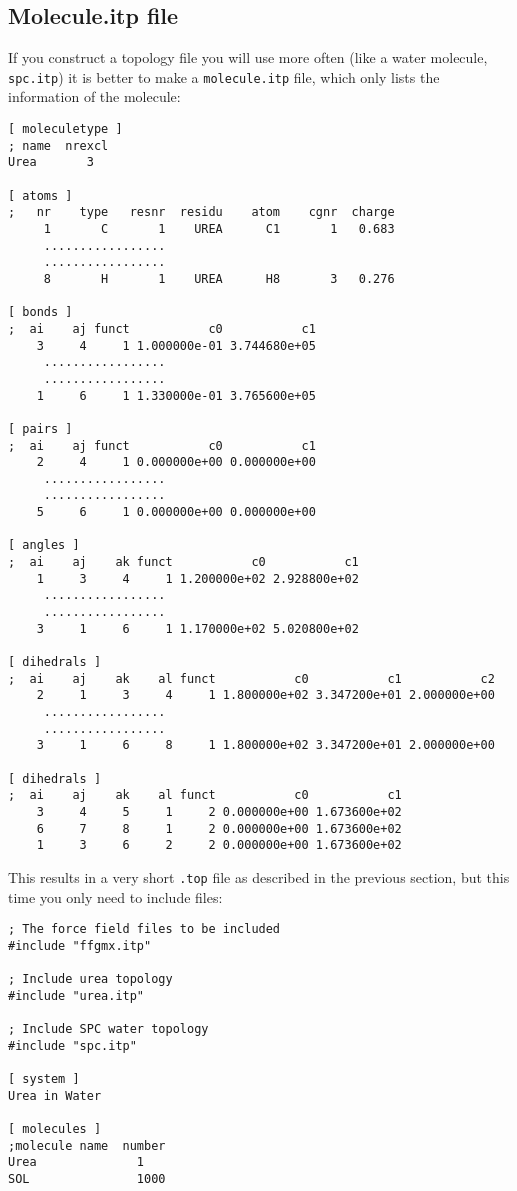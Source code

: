 \subsection{Molecule.itp file}
\label{subsec:molitp}
If you construct a topology file you will use more often (like a water
molecule, {\tt spc.itp}) it is better to make a {\tt molecule.itp}
file, which only lists the information of the molecule: 
{\small\begin{verbatim}
[ moleculetype ]
; name  nrexcl
Urea       3

[ atoms ]
;   nr    type   resnr  residu    atom    cgnr  charge
     1       C       1    UREA      C1       1	 0.683	
     .................
     .................
     8       H       1    UREA      H8       3	 0.276

[ bonds ]
;  ai    aj funct           c0           c1
    3     4     1 1.000000e-01 3.744680e+05 
     .................
     .................
    1     6     1 1.330000e-01 3.765600e+05 

[ pairs ]
;  ai    aj funct           c0           c1
    2     4     1 0.000000e+00 0.000000e+00 
     .................
     .................
    5     6     1 0.000000e+00 0.000000e+00 

[ angles ]
;  ai    aj    ak funct           c0           c1
    1     3     4     1 1.200000e+02 2.928800e+02 
     .................
     .................
    3     1     6     1 1.170000e+02 5.020800e+02 

[ dihedrals ]
;  ai    aj    ak    al funct           c0           c1           c2
    2     1     3     4     1 1.800000e+02 3.347200e+01 2.000000e+00 
     .................
     .................
    3     1     6     8     1 1.800000e+02 3.347200e+01 2.000000e+00 

[ dihedrals ]
;  ai    aj    ak    al funct           c0           c1
    3     4     5     1     2 0.000000e+00 1.673600e+02 
    6     7     8     1     2 0.000000e+00 1.673600e+02 
    1     3     6     2     2 0.000000e+00 1.673600e+02 
\end{verbatim}
}
This results in a very short {\tt *.top} file as described in the
previous section, but this time you only need to include files:
{\small\begin{verbatim}
; The force field files to be included
#include "ffgmx.itp"
	
; Include urea topology
#include "urea.itp"

; Include SPC water topology
#include "spc.itp"

[ system ]
Urea in Water

[ molecules ]
;molecule name  number
Urea              1
SOL               1000
\end{verbatim}}

